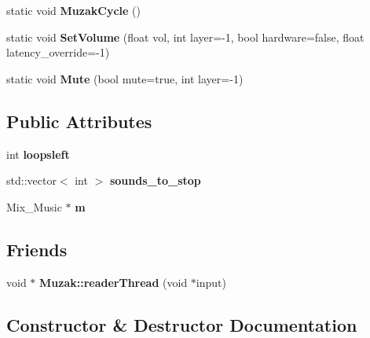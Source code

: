 \begin{DoxyCompactItemize}
\item 
static void {\bfseries Muzak\+Cycle} ()\hypertarget{classMusic_a617fd7b671bab85df6fcab877c4eee92}{}\label{classMusic_a617fd7b671bab85df6fcab877c4eee92}

\item 
static void {\bfseries Set\+Volume} (float vol, int layer=-\/1, bool hardware=false, float latency\+\_\+override=-\/1)\hypertarget{classMusic_a682ca114170661f0035001f920124abe}{}\label{classMusic_a682ca114170661f0035001f920124abe}

\item 
static void {\bfseries Mute} (bool mute=true, int layer=-\/1)\hypertarget{classMusic_a4419389031f5fe9f0230dc0dc11e67a3}{}\label{classMusic_a4419389031f5fe9f0230dc0dc11e67a3}

\end{DoxyCompactItemize}
\subsection*{Public Attributes}
\begin{DoxyCompactItemize}
\item 
int {\bfseries loopsleft}\hypertarget{classMusic_a54bcea4791822e7d90a543d587201492}{}\label{classMusic_a54bcea4791822e7d90a543d587201492}

\item 
std\+::vector$<$ int $>$ {\bfseries sounds\+\_\+to\+\_\+stop}\hypertarget{classMusic_ab4b5b13209d00e74e16f7d222f13d8d9}{}\label{classMusic_ab4b5b13209d00e74e16f7d222f13d8d9}

\item 
Mix\+\_\+\+Music $\ast$ {\bfseries m}\hypertarget{classMusic_ac299f3f379d8cc687bfe011b304e7bc9}{}\label{classMusic_ac299f3f379d8cc687bfe011b304e7bc9}

\end{DoxyCompactItemize}
\subsection*{Friends}
\begin{DoxyCompactItemize}
\item 
void $\ast$ {\bfseries Muzak\+::reader\+Thread} (void $\ast$input)\hypertarget{classMusic_a1a86fb27980f9dbf774ad590a2608783}{}\label{classMusic_a1a86fb27980f9dbf774ad590a2608783}

\end{DoxyCompactItemize}


\subsection{Constructor \& Destructor Documentation}
